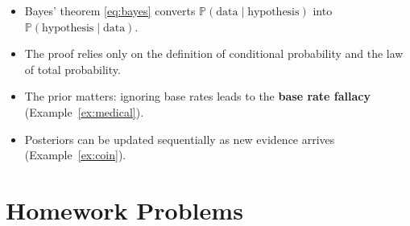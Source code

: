 \documentclass{article}
\theoremstyle{remark}
\newlength{\subsecindent}
\newenvironment{secbody}{%
  \begin{list}{}{%
    \setlength{\leftmargin}{\subsecindent}%
    \setlength{\rightmargin}{0pt}%
    \setlength{\topsep}{0pt}%
    \setlength{\partopsep}{0pt}%
    \setlength{\parsep}{\parskip}%
    \setlength{\itemsep}{\parskip}%
  }\item\relax
}{\end{list}}
\newcommand{\Prob}{\mathbb{P}}
\newcommand{\given}{\mid}
\begin{document}
\begin{secbody}
\begin{itemize}
  \item Bayes' theorem \eqref{eq:bayes} converts
        $\Prob(\text{data} \given \text{hypothesis})$ into
        $\Prob(\text{hypothesis} \given \text{data})$.
  \item The proof relies only on the definition of conditional probability
        and the law of total probability.
  \item The prior matters: ignoring base rates leads to the
        \textbf{base rate fallacy} (Example~\ref{ex:medical}).
  \item Posteriors can be updated sequentially as new evidence arrives
        (Example~\ref{ex:coin}).
\end{itemize}
\end{secbody}

\newpage
\section{Homework Problems}
\label{sec:homework}
\end{document}
